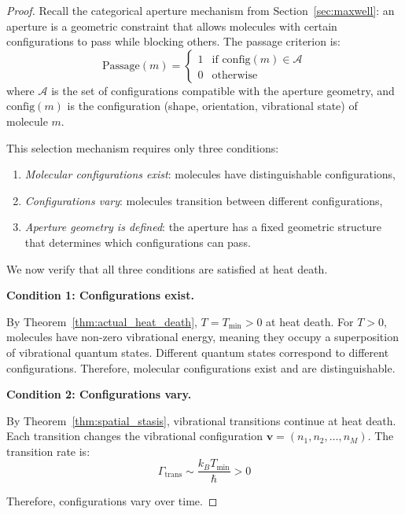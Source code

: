 \documentclass[12pt,a4paper]{article}
\theoremstyle{definition}
\theoremstyle{remark}
\begin{document}
\begin{proof}
Recall the categorical aperture mechanism from Section~\ref{sec:maxwell}: an aperture is a geometric constraint that allows molecules with certain configurations to pass while blocking others. The passage criterion is:
\begin{equation}
\text{Passage}(m) = \begin{cases} 
1 & \text{if } \text{config}(m) \in \mathcal{A} \\ 
0 & \text{otherwise} 
\end{cases}
\end{equation}
where $\mathcal{A}$ is the set of configurations compatible with the aperture geometry, and $\text{config}(m)$ is the configuration (shape, orientation, vibrational state) of molecule $m$.

This selection mechanism requires only three conditions:
\begin{enumerate}
    \item \emph{Molecular configurations exist}: molecules have distinguishable configurations,
    \item \emph{Configurations vary}: molecules transition between different configurations,
    \item \emph{Aperture geometry is defined}: the aperture has a fixed geometric structure that determines which configurations can pass.
\end{enumerate}

We now verify that all three conditions are satisfied at heat death.

\textbf{Condition 1: Configurations exist.}

By Theorem~\ref{thm:actual_heat_death}, $T = T_{\min} > 0$ at heat death. For $T > 0$, molecules have non-zero vibrational energy, meaning they occupy a superposition of vibrational quantum states. Different quantum states correspond to different configurations. Therefore, molecular configurations exist and are distinguishable.

\textbf{Condition 2: Configurations vary.}

By Theorem~\ref{thm:spatial_stasis}, vibrational transitions continue at heat death. Each transition changes the vibrational configuration $\mathbf{v} = (n_1, n_2, \ldots, n_M)$. The transition rate is:
\begin{equation}
\Gamma_{\text{trans}} \sim \frac{k_B T_{\min}}{\hbar} > 0
\end{equation}

Therefore, configurations vary over time.


\end{proof}
\end{document}
